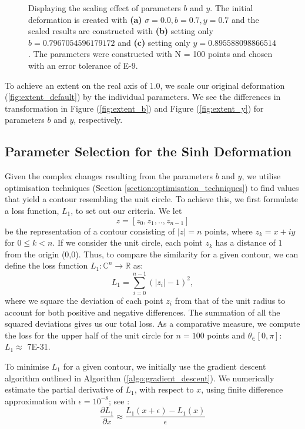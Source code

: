 \documentclass[a4paper]{report}
\begin{document}
\begin{figure}[H]
    \caption{Displaying the scaling effect of parameters $b$ and $y$. The initial deformation is created with \textbf{(a)} $\sigma = 0.0, b = 0.7, y = 0.7$ and the scaled results are constructed with \textbf{(b)} setting only $b = 0.7967054596179172$ and \textbf{(c)} setting only $y = 0.895588098866514$. The parameters were constructed with N = 100 points and chosen with an error tolerance of E-9.}
\end{figure}

To achieve an extent on the real axis of 1.0, we scale our original deformation (\autoref{fig:extent_default}) by the individual parameters. We see the differences in transformation in Figure (\ref{fig:extent_b}) and Figure (\ref{fig:extent_y}) for parameters $b$ and $y$, respectively.

\subsection{Parameter Selection for the Sinh Deformation}\label{section:parameter_selection}
Given the complex changes resulting from the parameters $b$ and $y$, we utilise optimisation techniques (Section \ref{section:optimisation_techniques}) to find values that yield a contour resembling the unit circle. To achieve this, we first formulate a loss function, $L_1$, to set out our criteria. We let 
\begin{equation*}
	z = [z_0, z_1, .., z_{n-1}]
\end{equation*}
be the representation of a contour consisting of $|z| = n$ points, where $z_k = x + iy$ for $0 \leq k < n$. If we consider the unit circle, each point $z_k$ has a distance of $1$ from the origin (0,0). Thus, to compare the similarity for a given contour, we can define the loss function $L_1: \mathbb{C}^n \rightarrow \mathbb{R}$ as:
\begin{equation}
L_1 = \sum_{i=0}^{n-1} \left( |z_i| - 1 \right)^2,
\end{equation}
where we square the deviation of each point $z_i$ from that of the unit radius to account for both positive and negative differences. The summation of all the squared deviations gives us our total loss. As a comparative measure, we compute the loss for the upper half of the unit circle for $n = 100$ points and $\theta_\in [0, \pi]$: $L_1\approx$ 7E-31.

To minimise $L_1$ for a given contour, we initially use the gradient descent algorithm outlined in Algorithm (\ref{algo:gradient_descent}). We numerically estimate the partial derivative of $L_1$, with respect to $x$, using finite difference approximation with $\epsilon = 10^{-8}$; see \citet{burden1997numerical}:
\begin{equation}\label{eq:finite_diff}
\frac{\partial L_1}{\partial x} \approx \frac{L_1(x + \epsilon) - L_1(x)}{\epsilon}
\end{equation}
\end{document}
